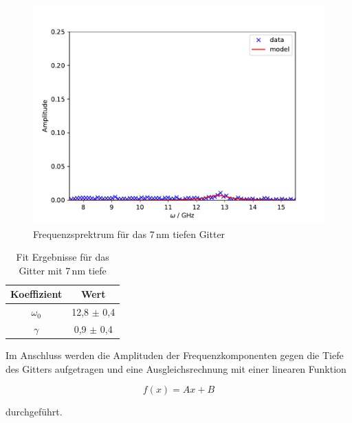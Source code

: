 \begin{figure}[h!]
 	\centering
 	\includegraphics[width=\textwidth]{img/008_a000_b0_e245_G1fft.pdf}
 	\caption{Frequenzsprektrum für das 7\,nm tiefen Gitter}
 	\label{abb:film}
\end{figure}

\begin{table}[h!]
 \centering
\begin{tabular}{cc}
    Koeffizient & Wert \\
	\midrule
 	$\omega_0$ & 12,8 $\pm$ 0,4 \\
 	$\gamma$ & 0,9 $\pm$ 0,4 \\
\end{tabular}
\caption{Fit Ergebnisse für das Gitter mit 7\,nm tiefe}
\label{tab:fit}
\end{table}


Im Anschluss werden die Amplituden der Frequenzkomponenten gegen die Tiefe des Gitters aufgetragen und eine Ausgleichsrechnung
mit einer linearen Funktion

\begin{equation}
f(x) = Ax + B
\end{equation}

durchgeführt.

